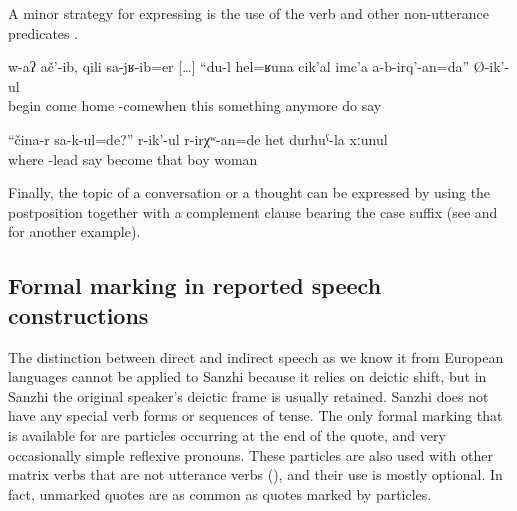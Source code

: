 A minor strategy for expressing  is the use of the verb   and other non-utterance predicates .
%
\begin{exe}
	\ex	\label{ex:He began when he came home, I will not anymore do things like this}
	\gll	w-aʔ	ač'-ib,	qili	sa-jʁ-ib=er	[\ldots]	``du-l	hel=ʁuna	cik'al	imc'a	a-b-irq'-an=da''	Ø-ik'-ul\\
		begin	come	home	-comewhen	{}		this something	anymore	do	say\\
	\glt	{}

	\ex	\label{ex:‎‎‎The daughter-in-law must have asked, From where do you bring the body}
	\gll	``čina-r	sa-k-ul=de?''	r-ik'-ul	r-irχʷ-an=de	het	durħuˁ-la	xːunul	\\
		where	-lead	say	become	that	boy	woman\\
	\glt	{}
\end{exe}

Finally, the topic of a conversation or a thought can be expressed by using the postposition   together with a complement clause bearing the  case suffix (see  and  for another example).



\subsection{Formal marking in reported speech constructions}
\label{ssec:Formal marking in reported speech constructions}

The distinction between direct and indirect speech as we know it from European languages cannot be applied to Sanzhi because it relies on deictic shift, but in Sanzhi the original speaker's deictic frame is usually retained. Sanzhi does not have any special verb forms or sequences of tense. The only formal marking that is available for  are  particles occurring at the end of the quote, and very occasionally simple reflexive pronouns. These  particles are also used with other matrix verbs that are not utterance verbs (), and their use is mostly optional. In fact, unmarked quotes are as common as quotes marked by  particles.

